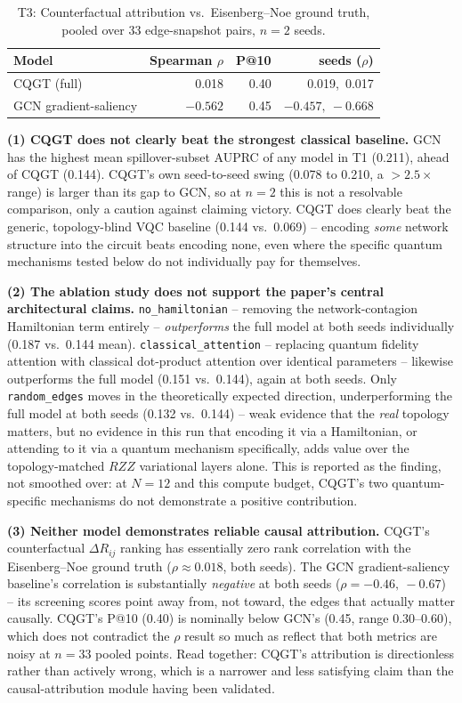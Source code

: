 \documentclass[journal]{IEEEtran}
\begin{document}
\begin{table}[t]
  \centering
  \caption{T3: Counterfactual attribution vs.\ Eisenberg--Noe ground truth, pooled over 33 edge-snapshot pairs, $n=2$ seeds.}
  \label{tab:t3}
  \begin{tabular}{lrrr}
    \toprule
    Model & Spearman $\rho$ & P@10 & seeds ($\rho$) \\
    \midrule
    CQGT (full)          & 0.018  & 0.40 & 0.019,\ 0.017 \\
    GCN gradient-saliency & $-0.562$ & 0.45 & $-0.457,\ -0.668$ \\
    \bottomrule
  \end{tabular}
\end{table}

\textbf{(1) CQGT does not clearly beat the strongest classical baseline.}
GCN has the highest mean spillover-subset AUPRC of any model in T1
(0.211), ahead of CQGT (0.144). CQGT's own seed-to-seed swing (0.078 to
0.210, a $>2.5\times$ range) is larger than its gap to GCN, so at $n=2$
this is not a resolvable comparison, only a caution against claiming
victory. CQGT does clearly beat the generic, topology-blind VQC baseline
(0.144 vs.\ 0.069) -- encoding \emph{some} network structure into the
circuit beats encoding none, even where the specific quantum mechanisms
tested below do not individually pay for themselves.

\textbf{(2) The ablation study does not support the paper's central
architectural claims.} \texttt{no\_hamiltonian} -- removing the
network-contagion Hamiltonian term entirely -- \emph{outperforms} the
full model at both seeds individually (0.187 vs.\ 0.144 mean).
\texttt{classical\_attention} -- replacing quantum fidelity attention
with classical dot-product attention over identical parameters --
likewise outperforms the full model (0.151 vs.\ 0.144), again at both
seeds. Only \texttt{random\_edges} moves in the theoretically expected
direction, underperforming the full model at both seeds (0.132 vs.\
0.144) -- weak evidence that the \emph{real} topology matters, but no
evidence in this run that encoding it via a Hamiltonian, or attending to
it via a quantum mechanism specifically, adds value over the
topology-matched $RZZ$ variational layers alone. This is reported as the
finding, not smoothed over: at $N=12$ and this compute budget, CQGT's two
quantum-specific mechanisms do not demonstrate a positive contribution.

\textbf{(3) Neither model demonstrates reliable causal attribution.}
CQGT's counterfactual $\Delta R_{ij}$ ranking has essentially zero rank
correlation with the Eisenberg--Noe ground truth ($\rho \approx 0.018$,
both seeds). The GCN gradient-saliency baseline's correlation is
substantially \emph{negative} at both seeds ($\rho = -0.46,\ -0.67$) --
its screening scores point away from, not toward, the edges that
actually matter causally. CQGT's P@10 (0.40) is nominally below GCN's
(0.45, range 0.30--0.60), which does not contradict the $\rho$ result so
much as reflect that both metrics are noisy at $n=33$ pooled points. Read
together: CQGT's attribution is directionless rather than actively wrong,
which is a narrower and less satisfying claim than the causal-attribution
module having been validated.
\end{document}
